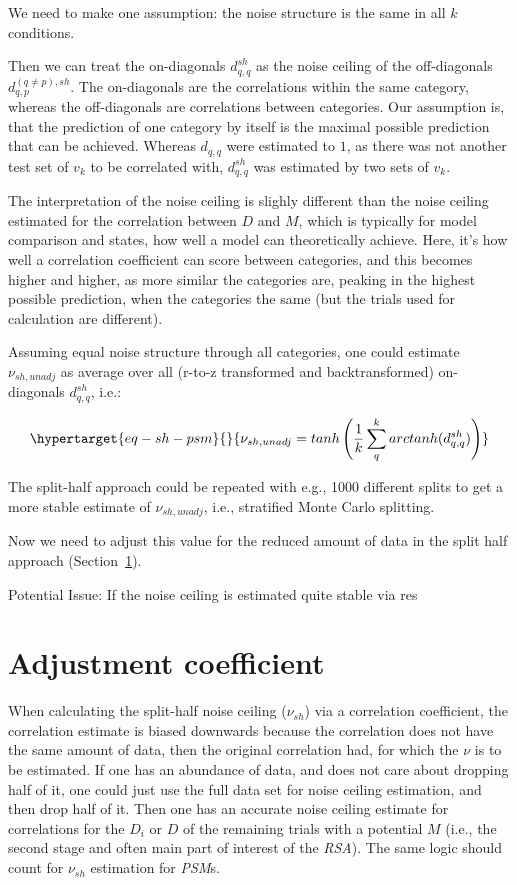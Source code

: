 \documentclass[
  letterpaper,
  DIV=11,
  numbers=noendperiod]{scrartcl}
\begin{document}
We need to make one assumption: the noise structure is the same in all
\(k\) conditions.

Then we can treat the on-diagonals \(d_{q,q}^{sh}\) as the noise ceiling
of the off-diagonals \(d_{q,p}^{(q \ne p), sh}\). The on-diagonals are
the correlations within the same category, whereas the off-diagonals are
correlations between categories. Our assumption is, that the prediction
of one category by itself is the maximal possible prediction that can be
achieved. Whereas \(d_{q,q}\) were estimated to \(1\), as there was not
another test set of \(v_k\) to be correlated with, \(d_{q,q}^{sh}\) was
estimated by two sets of \(v_k\).

The interpretation of the noise ceiling is slighly different than the
noise ceiling estimated for the correlation between \(D\) and \(M\),
which is typically for model comparison and states, how well a model can
theoretically achieve. Here, it's how well a correlation coefficient can
score between categories, and this becomes higher and higher, as more
similar the categories are, peaking in the highest possible prediction,
when the categories the same (but the trials used for calculation are
different).

Assuming equal noise structure through all categories, one could
estimate \(\nu_{sh, unadj}\) as average over all (r-to-z transformed and
backtransformed) on-diagonals \(d_{q,q}^{sh}\), i.e.:

\begin{equation}\protect\hypertarget{eq-sh-psm}{}{
\nu_{sh, unadj} = tanh \left( \frac{1}{k} \sum_q^k arctanh(d_{q,q}^{sh}) \right)
}\label{eq-sh-psm}\end{equation}

The split-half approach could be repeated with e.g., 1000 different
splits to get a more stable estimate of \(\nu_{sh, unadj}\), i.e.,
stratified Monte Carlo splitting.

Now we need to adjust this value for the reduced amount of data in the
split half approach (Section~\ref{sec-adj}).

Potential Issue: If the noise ceiling is estimated quite stable via res

\hypertarget{sec-adj}{%
\section{Adjustment coefficient}\label{sec-adj}}

When calculating the split-half noise ceiling (\(\nu_{sh}\)) via a
correlation coefficient, the correlation estimate is biased downwards
because the correlation does not have the same amount of data, then the
original correlation had, for which the \(\nu\) is to be estimated. If
one has an abundance of data, and does not care about dropping half of
it, one could just use the full data set for noise ceiling estimation,
and then drop half of it. Then one has an accurate noise ceiling
estimate for correlations for the \(D_i\) or \(D\) of the remaining
trials with a potential \(M\) (i.e., the second stage and often main
part of interest of the \emph{RSA}). The same logic should count for
\(\nu_{sh}\) estimation for \emph{PSM}s.
\end{document}
